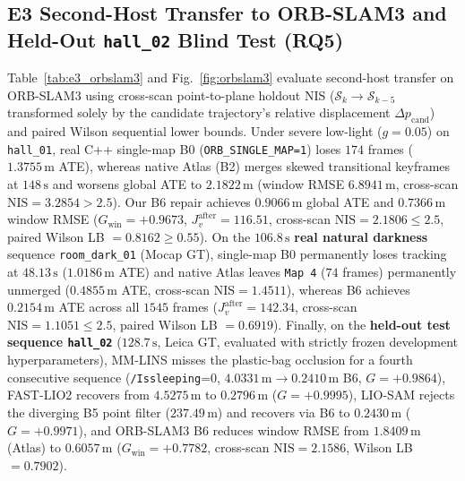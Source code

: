 \documentclass[journal]{IEEEtran}
\begin{document}
\subsection{E3 Second-Host Transfer to ORB-SLAM3 and Held-Out \texorpdfstring{\texttt{hall\_02}}{hall\_02} Blind Test (RQ5)}
Table~\ref{tab:e3_orbslam3} and Fig.~\ref{fig:orbslam3} evaluate second-host transfer on ORB-SLAM3 \cite{campos2021orbslam3} using cross-scan point-to-plane holdout NIS ($\mathcal{S}_k \to \mathcal{S}_{k-5}$ transformed solely by the candidate trajectory's relative displacement $\Delta p_{\mathrm{cand}}$) and paired Wilson sequential lower bounds. Under severe low-light ($g=0.05$) on \texttt{hall\_01}, real C++ single-map B0 (\texttt{ORB\_SINGLE\_MAP=1}) loses $174$ frames ($1.3755\,\mathrm{m}$ ATE), whereas native Atlas (B2) merges skewed transitional keyframes at $148\,\mathrm{s}$ and worsens global ATE to $2.1822\,\mathrm{m}$ (window RMSE $6.8941\,\mathrm{m}$, cross-scan $\mathrm{NIS}=3.2854 > 2.5$). Our B6 repair achieves $0.9066\,\mathrm{m}$ global ATE and $0.7366\,\mathrm{m}$ window RMSE ($G_{\mathrm{win}}=+0.9673$, $J_v^{\mathrm{after}}=116.51$, cross-scan $\mathrm{NIS}=2.1806\le 2.5$, paired Wilson LB $=0.8162\ge 0.55$). On the $106.8\,\mathrm{s}$ \textbf{real natural darkness} sequence \texttt{room\_dark\_01} (Mocap GT), single-map B0 permanently loses tracking at $48.13\,\mathrm{s}$ ($1.0186\,\mathrm{m}$ ATE) and native Atlas leaves \texttt{Map~4} ($74$ frames) permanently unmerged ($0.4855\,\mathrm{m}$ ATE, cross-scan $\mathrm{NIS}=1.4511$), whereas B6 achieves $0.2154\,\mathrm{m}$ ATE across all $1545$ frames ($J_v^{\mathrm{after}}=142.34$, cross-scan $\mathrm{NIS}=1.1051\le 2.5$, paired Wilson LB $=0.6919$). Finally, on the \textbf{held-out test sequence \texttt{hall\_02}} ($128.7\,\mathrm{s}$, Leica GT, evaluated with strictly frozen development hyperparameters), MM-LINS misses the plastic-bag occlusion for a fourth consecutive sequence (\texttt{/Issleeping}=0, $4.0331\,\mathrm{m}\to 0.2410\,\mathrm{m}$ B6, $G=+0.9864$), FAST-LIO2 recovers from $4.5275\,\mathrm{m}$ to $\mathbf{0.2796\,\mathrm{m}}$ ($G=+0.9995$), LIO-SAM rejects the diverging B5 point filter ($237.49\,\mathrm{m}$) and recovers via B6 to $\mathbf{0.2430\,\mathrm{m}}$ ($G=+0.9971$), and ORB-SLAM3 B6 reduces window RMSE from $1.8409\,\mathrm{m}$ (Atlas) to $\mathbf{0.6057\,\mathrm{m}}$ ($G_{\mathrm{win}}=+0.7782$, cross-scan $\mathrm{NIS}=2.1586$, Wilson LB $=0.7902$).
\end{document}
